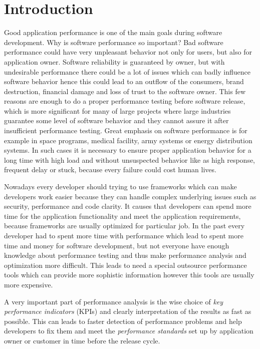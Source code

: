 

\chapter{Introduction}
Good application performance is one of the main goals during software development. Why is software performance so important? Bad software performance could have very unpleasant behavior not only for users, but also for application owner. Software reliability is guaranteed by owner, but with undesirable performance there could be a lot of issues which can badly influence software behavior hence this could lead to an outflow of the consumers, brand destruction, financial damage and loss of trust to the software owner. This few reasons are enough to do a proper performance testing before software release, which is more significant for many of large projects where large industries guarantee some level of software behavior and they cannot assure it after insufficient performance testing. Great emphasis on software performance is for example in space programs, medical facility, army systems or energy distribution systems. In such cases it is necessary to ensure proper application behavior for a long time with high load and without unsuspected behavior like as high response, frequent delay or stuck, because every failure could cost human lives. 

Nowadays every developer should trying to use frameworks which can make developers work easier because they can handle complex underlying issues such as security, performance and code clarity. It causes that developers can spend more time for the application functionality and meet the application requirements, because frameworks are usually optimized for particular job. In the past every developer had to spent more time with performance which lead to spent more time and money for software development, but not everyone have enough knowledge about performance testing and thus make performance analysis and optimization more difficult. This leads to need a special outsource performance tools which can provide more sophistic information however this tools are usually more expensive.

A very important part of performance analysis is the wise choice of \emph{key performance indicators} (KPIs) \cite{Molyneaux:TAoAPT} and clearly interpretation of the results as fast as possible. This can leads to faster detection of performance problems and help developers to fix them and meet the \emph{performance standards} \cite{Molyneaux:TAoAPT} set up by application owner or customer in time before the release cycle. 

